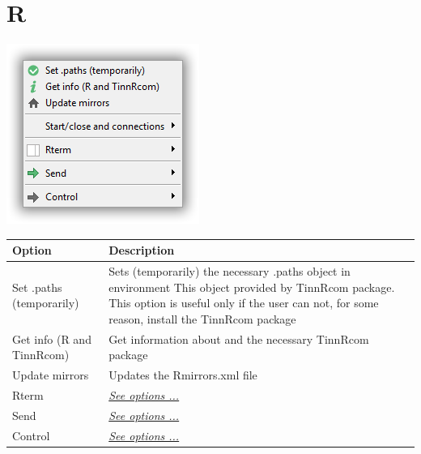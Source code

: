 
\hypertarget{menu_r}{}
\section{R}

\includegraphics[scale=0.50]{./res/menu_r.png}\\

\begin{scriptsize}
  \begin{tabularx}{\textwidth}{>{\hsize=0.5\hsize}X>{\hsize=0.7\hsize}X}\\
    \hline
    \textbf{Option} & \textbf{Description} \\
    \hline
    Set .paths (temporarily) & Sets (temporarily) the necessary .paths object in \RR{} environment
    This object provided by TinnRcom package. This option is useful only if the user can not, for some reason,   install the TinnRcom package \\
    Get info (R and TinnRcom) & Get information about \RR{} and the necessary TinnRcom package \\
    Update mirrors & Updates the Rmirrors.xml file \\
    Rterm & \textit{\href{\#menu\_r\_rterm}{See options ...}} \\
    Send & \textit{\href{\#menu\_r\_send}{See options ...}} \\
    Control & \textit{\href{\#menu\_r\_control}{See options ...}} \\
    \hline
  \end{tabularx}
\end{scriptsize}


\hypertarget{menu_r_startcloseandconections}{}
